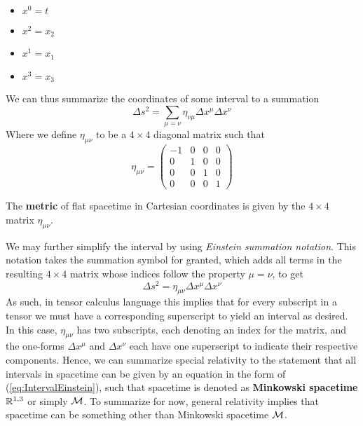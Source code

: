 \documentclass{article}
\begin{document}
	 	\begin{multicols}{4}
	 		\begin{itemize}
	 			\item $x^0 = t$
	 			\item $x^2 = x_2$
	 			\item $x^1 = x_1$
	 			\item $x^3 = x_3$
	 		\end{itemize}
	 	\end{multicols}
	 	We can thus summarize the coordinates of some interval to a summation
	 	$$ \Delta s^2 = \sum_{\mu=\nu} \eta_{\nu\mu}\Delta x^\mu \Delta x^\nu$$ 
	 	Where we define $\eta_{\mu\nu}$ to be a $4\times4$ diagonal matrix such that
	 	$$ \eta_{\mu\nu} = \begin{pmatrix}
	 		-1	&	0	&	0	&	0\\
	 		0	&	1	&	0	&	0\\
	 		0	&	0	&	1	&	0\\
	 		0	&	0	&	0	&	1
	 	\end{pmatrix}$$ 
	 	\begin{defn}
	 		The \textbf{metric} of flat spacetime in Cartesian coordinates is given by the $4 \times 4$ matrix $\eta_{\mu\nu}$.
	 	\end{defn}
	 	We may further simplify the interval by using \textit{Einstein summation notation}. This notation takes the summation symbol for granted, which adds all terms in the resulting $4\times4$ matrix whose indices follow the property $\mu=\nu$, to get
 		\begin{equation}
 			\label{eq:IntervalEinstein}
 			\Delta s^2 = \eta_{\mu\nu} \Delta x^\mu \Delta x^\nu
 		\end{equation}
 		As such, in tensor calculus language this implies that for every subscript in a tensor we must have a corresponding superscript to yield an interval as desired. In this case, $\eta_{\mu\nu}$ has two subscripts, each denoting an index for the matrix, and the one-forms $\Delta x^\mu$ and $\Delta x^\nu$ each have one superscript to indicate their respective components. Hence, we can summarize special relativity to the statement that all intervals in spacetime can be given by an equation in the form of (\ref{eq:IntervalEinstein}), such that spacetime is denoted as \textbf{Minkowski spacetime} $\mathbb{R}^{1,3}$ or simply $\mathcal{M}$. To summarize for now, general relativity implies that spacetime can be something other than Minkowski spacetime $\mathcal{M}$.
 		
\end{document}
